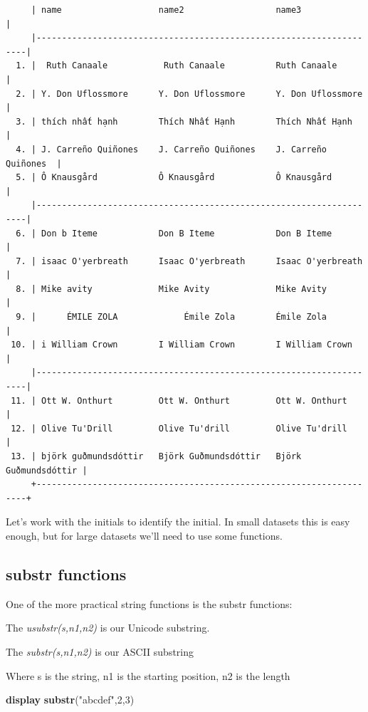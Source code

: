 \documentclass[
]{book}
\newenvironment{Shaded}{\begin{snugshade}}{\end{snugshade}}
\newcommand{\FunctionTok}[1]{\textcolor[rgb]{0.13,0.29,0.53}{\textbf{#1}}}
\newcommand{\KeywordTok}[1]{\textcolor[rgb]{0.13,0.29,0.53}{\textbf{#1}}}
\newcommand{\NormalTok}[1]{#1}
\newcommand{\StringTok}[1]{\textcolor[rgb]{0.31,0.60,0.02}{#1}}
\begin{document}
\begin{verbatim}
     | name                   name2                  name3                |
     |--------------------------------------------------------------------|
  1. |  Ruth Canaale           Ruth Canaale          Ruth Canaale         |
  2. | Y. Don Uflossmore      Y. Don Uflossmore      Y. Don Uflossmore    |
  3. | thích nhất hạnh        Thích Nhất Hạnh        Thích Nhất Hạnh      |
  4. | J. Carreño Quiñones    J. Carreño Quiñones    J. Carreño Quiñones  |
  5. | Ô Knausgård            Ô Knausgård            Ô Knausgård          |
     |--------------------------------------------------------------------|
  6. | Don b Iteme            Don B Iteme            Don B Iteme          |
  7. | isaac O'yerbreath      Isaac O'yerbreath      Isaac O'yerbreath    |
  8. | Mike avity             Mike Avity             Mike Avity           |
  9. |      ÉMILE ZOLA             Émile Zola        Émile Zola           |
 10. | i William Crown        I William Crown        I William Crown      |
     |--------------------------------------------------------------------|
 11. | Ott W. Onthurt         Ott W. Onthurt         Ott W. Onthurt       |
 12. | Olive Tu'Drill         Olive Tu'drill         Olive Tu'drill       |
 13. | björk guðmundsdóttir   Björk Guðmundsdóttir   Björk Guðmundsdóttir |
     +--------------------------------------------------------------------+
\end{verbatim}

Let's work with the initials to identify the initial. In small datasets this is easy enough, but for large datasets we'll need to use some functions.

\subsection{substr functions}\label{substr-functions}

One of the more practical string functions is the substr functions:

The \emph{usubstr(s,n1,n2)} is our Unicode substring.

The \emph{substr(s,n1,n2)} is our ASCII substring

Where s is the string, n1 is the starting position, n2 is the length

\begin{Shaded}
\begin{Highlighting}[]
    \KeywordTok{display} \FunctionTok{substr}\NormalTok{(}\StringTok{"abcdef"}\NormalTok{,2,3)}
\end{Highlighting}
\end{Shaded}
\end{document}
